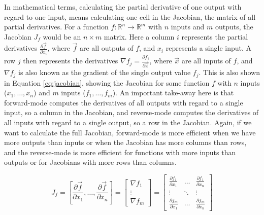         In mathematical terms, calculating the partial derivative of one output with regard to one input, means calculating one cell in the Jacobian, the matrix of all partial derivatives.
        For a function $f:\mathbb{R}^n\to\mathbb{R}^m$ with $n$ inputs and $m$ outputs, the Jacobian $J_f$ would be an $n\times m$ matrix.
        Here a column $i$ represents the partial derivatives $\tfrac{\partial\vec{f}}{\partial x_i}$, where $\vec{f}$ are all outputs of $f$, and $x_i$ represents a single input.
        A row $j$ then represents the derivatives $\nabla f_j=\tfrac{\partial f_j}{\partial\vec{x}}$, where $\vec{x}$ are all inputs of $f$, and $\nabla f_j$ is also known as the gradient of the single output value $f_j$.
        This is also shown in Equation \ref{eq:jacobian}, showing the Jacobian for some function $f$ with $n$ inputs ($x_1,\dots,x_n$) and $m$ inputs ($f_1,\dots,f_m$).
        An important take-away here is that forward-mode computes the derivatives of all outputs with regard to a single input, so a column in the Jacobian, and reverse-mode computes the derivatives of all inputs with regard to a single output, so a row in the Jacobian.
        Again, if we want to calculate the full Jacobian, forward-mode is more efficient when we have more outputs than inputs or when the Jacobian has more columns than rows, and the reverse-mode is more efficient for functions with more inputs than outputs or for Jacobians with more rows than columns.

        \begin{equation} \label{eq:jacobian}
            J_f=\left[\frac{\partial \vec{f}}{\partial x_1},\dots,\frac{\partial \vec{f}}{\partial x_n}\right]=\begin{bmatrix}\nabla f_1\\\vdots\\\nabla f_m\end{bmatrix}=\begin{bmatrix}
                \frac{\partial f_1}{\partial x_1} & \dots & \frac{\partial f_1}{\partial x_n}\\
                \vdots & \ddots & \vdots\\
                \frac{\partial f_m}{\partial x_1} & \dots & \frac{\partial f_m}{\partial x_n}
            \end{bmatrix}
        \end{equation}

